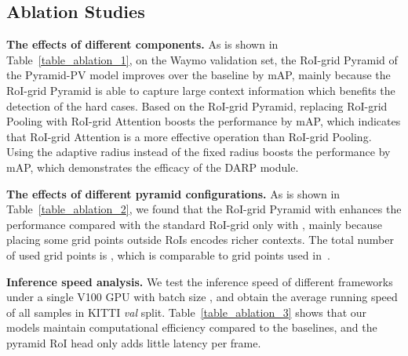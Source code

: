\documentclass[10pt,twocolumn,letterpaper]{article}
\begin{document}
\subsection{Ablation Studies} \label{Ablation Studies}
\textbf{The effects of different components.} As is shown in Table~\ref{table_ablation_1}, on the Waymo validation set, the RoI-grid Pyramid of the Pyramid-PV model improves over the baseline by  mAP, mainly because the RoI-grid Pyramid is able to capture large context information which benefits the detection of the hard cases. Based on the RoI-grid Pyramid, replacing RoI-grid Pooling with RoI-grid Attention boosts the performance by  mAP, which indicates that RoI-grid Attention is a more effective operation than RoI-grid Pooling. Using the adaptive radius  instead of the fixed radius boosts the performance by  mAP, which demonstrates the efficacy of the DARP module. 

\textbf{The effects of different pyramid configurations.} As is shown in Table~\ref{table_ablation_2}, we found that the RoI-grid Pyramid with  enhances the performance compared with the standard RoI-grid only with , mainly because placing some grid points outside RoIs encodes richer contexts. The total number of used grid points is , which is comparable to  grid points used in~\cite{shi2020pv}.

\textbf{Inference speed analysis.} We test the inference speed of different frameworks under a single V100 GPU with batch size , and obtain the average running speed of all samples in KITTI \textit{val} split. Table~\ref{table_ablation_3} shows that our models maintain computational efficiency compared to the baselines, and the pyramid RoI head only adds little latency per frame.

\begin{table}[]
\setlength{\belowcaptionskip}{10pt}
\caption{Effects of different components in Pyramid-PV on the Waymo dataset. R.P.: the RoI-grid Pyramid. D.A.R.P.: the Density-Aware Radius Prediction module. R.A.: RoI-grid Attention. : re-implemented by ourselves with the official code.} \label{table_ablation_1}
\vspace{-2mm}
\end{table}
\end{document}
